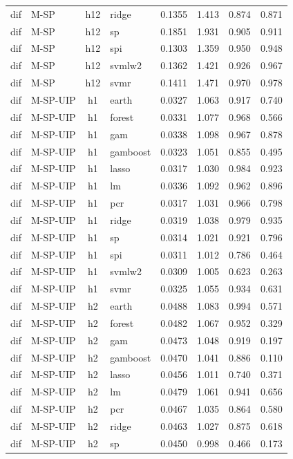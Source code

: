 \begin{ThreePartTable}
\begin{longtable}[t]{llclcccc}
dif & M-SP & h12 & ridge & 0.1355 & 1.413 & 0.874 & 0.871\\
dif & M-SP & h12 & sp & 0.1851 & 1.931 & 0.905 & 0.911\\
dif & M-SP & h12 & spi & 0.1303 & 1.359 & 0.950 & 0.948\\
dif & M-SP & h12 & svmlw2 & 0.1362 & 1.421 & 0.926 & 0.967\\
dif & M-SP & h12 & svmr & 0.1411 & 1.471 & 0.970 & 0.978\\
\addlinespace
dif & M-SP-UIP & h1 & earth & 0.0327 & 1.063 & 0.917 & 0.740\\
dif & M-SP-UIP & h1 & forest & 0.0331 & 1.077 & 0.968 & 0.566\\
dif & M-SP-UIP & h1 & gam & 0.0338 & 1.098 & 0.967 & 0.878\\
dif & M-SP-UIP & h1 & gamboost & 0.0323 & 1.051 & 0.855 & 0.495\\
dif & M-SP-UIP & h1 & lasso & 0.0317 & 1.030 & 0.984 & 0.923\\
dif & M-SP-UIP & h1 & lm & 0.0336 & 1.092 & 0.962 & 0.896\\
dif & M-SP-UIP & h1 & pcr & 0.0317 & 1.031 & 0.966 & 0.798\\
dif & M-SP-UIP & h1 & ridge & 0.0319 & 1.038 & 0.979 & 0.935\\
dif & M-SP-UIP & h1 & sp & 0.0314 & 1.021 & 0.921 & 0.796\\
dif & M-SP-UIP & h1 & spi & 0.0311 & 1.012 & 0.786 & 0.464\\
dif & M-SP-UIP & h1 & svmlw2 & 0.0309 & 1.005 & 0.623 & 0.263\\
dif & M-SP-UIP & h1 & svmr & 0.0325 & 1.055 & 0.934 & 0.631\\
\addlinespace
dif & M-SP-UIP & h2 & earth & 0.0488 & 1.083 & 0.994 & 0.571\\
dif & M-SP-UIP & h2 & forest & 0.0482 & 1.067 & 0.952 & 0.329\\
dif & M-SP-UIP & h2 & gam & 0.0473 & 1.048 & 0.919 & 0.197\\
dif & M-SP-UIP & h2 & gamboost & 0.0470 & 1.041 & 0.886 & 0.110\\
dif & M-SP-UIP & h2 & lasso & 0.0456 & 1.011 & 0.740 & 0.371\\
dif & M-SP-UIP & h2 & lm & 0.0479 & 1.061 & 0.941 & 0.656\\
dif & M-SP-UIP & h2 & pcr & 0.0467 & 1.035 & 0.864 & 0.580\\
dif & M-SP-UIP & h2 & ridge & 0.0463 & 1.027 & 0.875 & 0.618\\
dif & M-SP-UIP & h2 & sp & 0.0450 & 0.998 & 0.466 & 0.173\\

\end{longtable}
\end{ThreePartTable}
